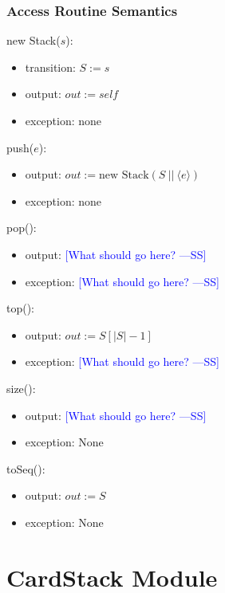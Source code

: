 \documentclass[12pt]{article}
\newcommand{\authornote}[3]{\textcolor{#1}{[#3 ---#2]}}
\newcommand{\authornote}[3]{}
\newcommand{\wss}[1]{\authornote{blue}{SS}{#1}}
\begin{document}
\subsubsection* {Access Routine Semantics}

new Stack($s$):
\begin{itemize}
\item transition: $S := s$

\item output: $\mathit{out} := \mathit{self}$
\item exception: none
\end{itemize}

\noindent push($e$):
\begin{itemize}
\item output: $out := \text{new Stack}(S\ ||\ \langle e \rangle)$
\item exception: none
\end{itemize}

\noindent pop():
\begin{itemize}
\item output: \wss{What should go here?}

\item exception: \wss{What should go here?}

\end{itemize}

\noindent top():
\begin{itemize}
\item output: $\mathit{out} := S[|S| - 1]$

\item exception: \wss{What should go here?}

\end{itemize}

\noindent size():
\begin{itemize}
\item output: \wss{What should go here?}
\item exception: None
\end{itemize}

\noindent toSeq():
\begin{itemize}
\item output: $\mathit{out} := S$
\item exception: None

\end{itemize}

\newpage

\section* {CardStack Module}
\end{document}
